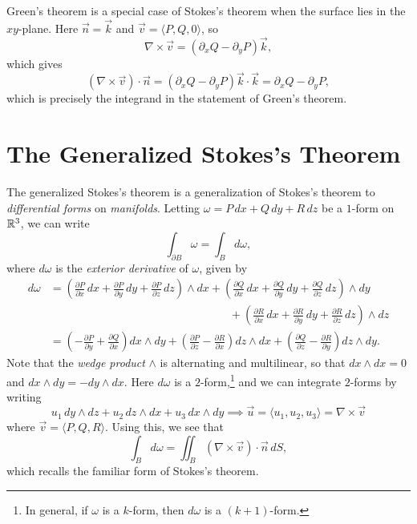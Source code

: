 \begin{remark}
  Green's theorem is a special case of Stokes's
  theorem when the surface lies in the $xy$-plane.
  Here $\vec{n} = \vec{k}$ and $\vec{v} = \langle P, Q, 0 \rangle$, so
  \[
    \nabla \times \vec{v} = (\partial_x Q - \partial_y P) \vec{k},
  \]
  which gives
  \[
    (\nabla \times \vec{v}) \cdot \vec{n} = (\partial_x Q - \partial_y P) \vec{k} \cdot \vec{k} = \partial_x Q - \partial_y P,
  \]
  which is precisely the integrand in the statement of
  Green's theorem.
\end{remark}

\section{The Generalized Stokes's Theorem}
The generalized Stokes's theorem is a generalization of
Stokes's theorem to \emph{differential forms} on \emph{manifolds}.
Letting $\omega = P\, dx + Q\, dy + R\, dz$ be a
$1$-form on $\mathbb{R}^3$, we can write
\[
  \int_{\partial B} \omega = \int_B d\omega,
\]
where $d \omega$ is the \emph{exterior derivative} of $\omega$, given by
\begin{align*}
  d\omega
  &= \left(\frac{\partial P}{\partial x}\, dx + \frac{\partial P}{\partial y}\, dy + \frac{\partial P}{\partial z}\, dz\right) \land dx
  + \left(\frac{\partial Q}{\partial x}\, dx + \frac{\partial Q}{\partial y}\, dy + \frac{\partial Q}{\partial z}\, dz\right) \land dy \\
  &\hspace{16em} + \left(\frac{\partial R}{\partial x}\, dx + \frac{\partial R}{\partial y}\, dy + \frac{\partial R}{\partial z}\, dz\right) \land dz \\
  &= \left(-\frac{\partial P}{\partial y} + \frac{\partial Q}{\partial x}\right) dx \land dy
  + \left(\frac{\partial P}{\partial z} - \frac{\partial R}{\partial x}\right) dz \land dx
  + \left(\frac{\partial Q}{\partial z} - \frac{\partial R}{\partial y}\right) dz \land dy.
\end{align*}
Note that the \emph{wedge product} $\land$ is
alternating and multilinear, so that
$dx \land dx = 0$ and $dx \land dy = -dy \land dx$.
Here $d\omega$ is a $2$-form,\footnote{In general, if $\omega$ is a $k$-form, then $d\omega$ is a $(k + 1)$-form.} and we can integrate
$2$-forms by writing
\[
  u_1\, dy \land dz + u_2\, dz \land dx + u_3 \, dx \land dy
  \implies \vec{u} = \langle u_1, u_2, u_3 \rangle
  = \nabla \times \vec{v}
\]
where $\vec{v} = \langle P, Q, R \rangle$. Using this,
we see that
\[
  \int_B d\omega = \iint_B (\nabla \times \vec{v}) \cdot \vec{n} \, dS,
\]
which recalls the familiar form of Stokes's theorem.

